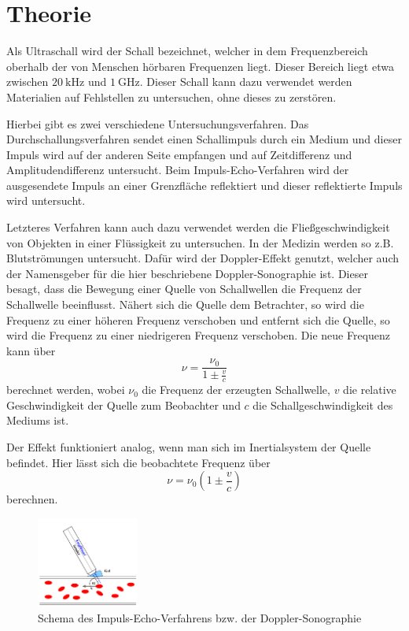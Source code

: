 \section{Theorie}
\label{sec:Theorie}

Als Ultraschall wird der Schall bezeichnet, welcher in dem Frequenzbereich oberhalb der von Menschen hörbaren Frequenzen liegt.
Dieser Bereich liegt etwa zwischen $\SI{20}{\kilo\hertz}$ und $\SI{1}{\giga\hertz}$.
Dieser Schall kann dazu verwendet werden Materialien auf Fehlstellen zu untersuchen, ohne dieses zu zerstören.

Hierbei gibt es zwei verschiedene Untersuchungsverfahren.
Das Durchschallungsverfahren sendet einen Schallimpuls durch ein Medium und dieser Impuls wird auf der anderen Seite empfangen und auf Zeitdifferenz und Amplitudendifferenz untersucht.
Beim Impuls-Echo-Verfahren wird der ausgesendete Impuls an einer Grenzfläche reflektiert und dieser reflektierte Impuls wird untersucht.

Letzteres Verfahren kann auch dazu verwendet werden die Fließgeschwindigkeit von Objekten in einer Flüssigkeit zu untersuchen.
In der Medizin werden so z.B. Blutströmungen untersucht.
Dafür wird der Doppler-Effekt genutzt, welcher auch der Namensgeber für die hier beschriebene Doppler-Sonographie ist.
Dieser besagt, dass die Bewegung einer Quelle von Schallwellen die Frequenz der Schallwelle beeinflusst.
Nähert sich die Quelle dem Betrachter, so wird die Frequenz zu einer höheren Frequenz verschoben und entfernt sich die Quelle, so wird die Frequenz zu einer niedrigeren Frequenz verschoben.
Die neue Frequenz kann über
\begin{equation}
    \nu = \frac{\nu_0}{1 \pm \frac{v}{c}}
    \label{eq:frequenz_quellenbewegung}
\end{equation}
berechnet werden, wobei $\nu_0$ die Frequenz der erzeugten Schallwelle, $v$ die relative Geschwindigkeit der Quelle zum Beobachter und $c$ die Schallgeschwindigkeit des Mediums ist.

Der Effekt funktioniert analog, wenn man sich im Inertialsystem der Quelle befindet. 
Hier lässt sich die beobachtete Frequenz über
\begin{equation}
    \nu = \nu_0 \left( 1 \pm \frac{v}{c} \right)
    \label{eq:frequenz_beobachterbewegung}
\end{equation}
berechnen.

\begin{figure}
    \centering
    \includegraphics[width=0.3\textwidth]{images/skizze_1.png}
    \caption{Schema des Impuls-Echo-Verfahrens bzw. der Doppler-Sonographie \cite{US3}}
    \label{fig:skizze_alpha}
\end{figure}

